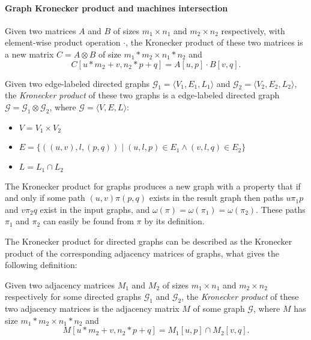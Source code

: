 \paragraph*{Graph Kronecker product and machines intersection}
\begin{definition}
Given two matrices $A$ and $B$ of sizes $m_1 \times n_1$ and $m_2 \times n_2$
respectively, with element-wise product operation $\cdot$, the Kronecker product of these two matrices is a new matrix $C = A \otimes B$ of size $m_1 * m_2 \times n_1 * n_2$ and \[C[u * m_2 + v,n_2 * p + q] = A[u,p] \cdot B[v,q].\]
\end{definition}
\begin{definition}
\label{def:graph:product}
Given two edge-labeled directed graphs $\mathcal{G}_1=\langle V_1, E_1, L_1 \rangle$
and $\mathcal{G}_2=\langle V_2, E_2, L_2 \rangle$,
the \textit{Kronecker product} of these two graphs is a edge-labeled directed graph
$\mathcal{G}=\mathcal{G}_1 \otimes \mathcal{G}_2$,
where $\mathcal{G}= \langle V, E, L \rangle$:
\begin{itemize}
    \item $V = V_1 \times V_2$
    \item $E = \{((u,v),l,(p,q)) \mid (u,l,p) \in E_1 \wedge (v,l,q) \in E_2 \}$
    \item $L = L_1 \cap L_2$
\end{itemize}
\end{definition}

The Kronecker product for graphs produces a new graph with a property
that if and only if some path $(u,v)\pi(p,q)$ exists in the result graph
then paths $u\pi_1p$ and $v\pi_2q$ exist in the input graphs,
and $\omega(\pi) = \omega(\pi_1) = \omega(\pi_2)$.
These paths $\pi_1$ and $\pi_2$ can easily be found from $\pi$ by its definition.

The Kronecker product for directed graphs can be described as
the Kronecker product of the corresponding adjacency matrices of graphs,
what gives the following definition:

\begin{definition}
\label{def:graph:adjproduct}
Given two adjacency matrices $M_1$ and $M_2$ of sizes
$m_1 \times n_1$ and $m_2 \times n_2$ respectively
for some directed graphs $\mathcal{G}_1$ and $\mathcal{G}_2$,
the \textit{Kronecker product} of these two adjacency matrices is the adjacency matrix $M$
of some graph $\mathcal{G}$, where $M$ has size $m_1 * m_2 \times n_1 * n_2$ and
\[M[u * m_2 + v,n_2 * p + q] = M_1[u,p] \cap M_2[v,q].\]
\end{definition}

